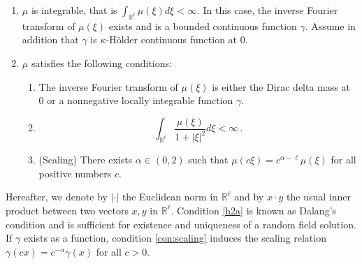 \documentclass[12pt,reqno]{amsart}
\theoremstyle{remark}
\newcommand{\1}{\mathbf{1}}
\def\RR{\mathbb{R}}
\begin{document}
	\begin{enumerate}[(H.\arabic*)]
		\item\label{Cov:bounded} $\mu$ is integrable, 
			that is $\int_{\RR^\ell}\mu(\xi)d \xi<\infty$. 
			In this case, the inverse Fourier transform of $\mu(\xi)$ exists and is a bounded continuous function $\gamma$. Assume in addition that $\gamma$ is $\kappa$-H\"older continuous  function at 0.
		\item\label{Cov:Dalang} $\mu$ satisfies the following conditions:
		\begin{enumerate}[(H.2a)]
			\item  The inverse Fourier transform of $\mu(\xi)$ is either the Dirac delta mass at 0 or a nonnegative  locally integrable function $\gamma$.
			\item\label{h2a} 
			\begin{equation}\label{k5}
				\int_{ \RR^\ell}\frac {\mu(\xi) }{1+ |\xi|^2}d \xi<\infty\,.
			\end{equation}
			\item\label{con:scaling} (Scaling) There exists $\alpha\in(0,2)$ such that $\mu(c \xi)=c^{\alpha-\ell}\mu(\xi)$ for all positive numbers $c$.
		\end{enumerate}
	\end{enumerate}
	Hereafter, we denote by $|\cdot|$ the Euclidean norm in $\RR^\ell$ and by $x\cdot y$ the usual inner product between two vectors $x,y$ in $\RR^\ell$. 
	Condition \ref{h2a} is known as Dalang's condition and is sufficient for existence and uniqueness of a random field solution.
	If $\gamma$ exists as a function, condition \ref{con:scaling} induces the scaling relation $\gamma(c x)=c^{-\alpha}\gamma(x)$ for all $c>0$. 
\end{document}
